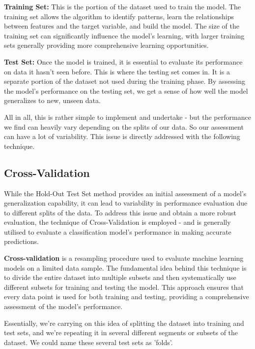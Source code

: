 \documentclass[letterpaper,10pt]{article}
\begin{document}
\textbf{Training Set:} This is the portion of the dataset used to train the model. The training set allows the algorithm to identify patterns, learn the relationships between features and the target variable, and build the model. The size of the training set can significantly influence the model’s learning, with larger training sets generally providing more comprehensive learning opportunities.

\textbf{Test Set:} Once the model is trained, it is essential to evaluate its performance on data it hasn't seen before. This is where the testing set comes in. It is a separate portion of the dataset not used during the training phase. By assessing the model's performance on the testing set, we get a sense of how well the model generalizes to new, unseen data. \par

All in all, this is rather simple to implement and undertake - but the performance we find can heavily vary depending on the splits of our data. So our assessment can have a lot of variability. This issue is directly addressed with the following technique. 

\subsection{Cross-Validation}
While the Hold-Out Test Set method provides an initial assessment of a model's generalization capability, it can lead to variability in performance evaluation due to different splits of the data. To address this issue and obtain a more robust evaluation, the technique of Cross-Validation is employed - and is generally utilised to evaluate a classification model's performance in making accurate predictions. \par

\textbf{Cross-validation} is a resampling procedure used to evaluate machine learning models on a limited data sample. The fundamental idea behind this technique is to divide the entire dataset into multiple subsets and then systematically use different subsets for training and testing the model. This approach ensures that every data point is used for both training and testing, providing a comprehensive assessment of the model's performance. \par

Essentially, we're carrying on this idea of splitting the dataset into training and test sets, and we're repeating it in several different segments or subsets of the dataset. We could name these several test sets as 'folds'. \par
\end{document}
